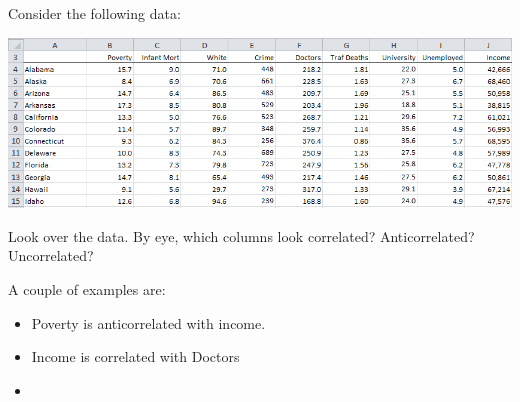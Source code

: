 Consider the following data: 

\begin{center}
    \includegraphics[width=\textwidth]{img/e1p1.png}
\end{center}

Look over the data. By eye, which columns look correlated? Anticorrelated? Uncorrelated?

\begin{solution}
    A couple of examples are:
    \begin{itemize}
        \item Poverty is anticorrelated with income.
        \item Income is correlated with Doctors
        \item 
    \end{itemize}
\end{solution}